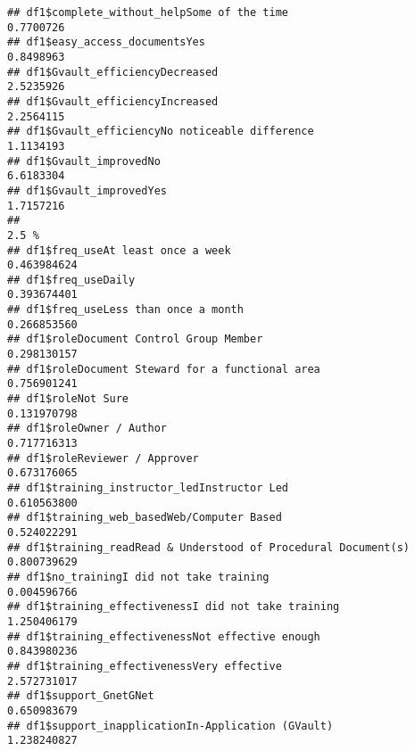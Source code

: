 \documentclass[]{article}
\begin{document}
\begin{verbatim}
## df1$complete_without_helpSome of the time                                                     0.7700726
## df1$easy_access_documentsYes                                                                  0.8498963
## df1$Gvault_efficiencyDecreased                                                                2.5235926
## df1$Gvault_efficiencyIncreased                                                                2.2564115
## df1$Gvault_efficiencyNo noticeable difference                                                 1.1134193
## df1$Gvault_improvedNo                                                                         6.6183304
## df1$Gvault_improvedYes                                                                        1.7157216
##                                                                                                    2.5 %
## df1$freq_useAt least once a week                                                             0.463984624
## df1$freq_useDaily                                                                            0.393674401
## df1$freq_useLess than once a month                                                           0.266853560
## df1$roleDocument Control Group Member                                                        0.298130157
## df1$roleDocument Steward for a functional area                                               0.756901241
## df1$roleNot Sure                                                                             0.131970798
## df1$roleOwner / Author                                                                       0.717716313
## df1$roleReviewer / Approver                                                                  0.673176065
## df1$training_instructor_ledInstructor Led                                                    0.610563800
## df1$training_web_basedWeb/Computer Based                                                     0.524022291
## df1$training_readRead & Understood of Procedural Document(s)                                 0.800739629
## df1$no_trainingI did not take training                                                       0.004596766
## df1$training_effectivenessI did not take training                                            1.250406179
## df1$training_effectivenessNot effective enough                                               0.843980236
## df1$training_effectivenessVery effective                                                     2.572731017
## df1$support_GnetGNet                                                                         0.650983679
## df1$support_inapplicationIn-Application (GVault)                                             1.238240827

\end{verbatim}
\end{document}
